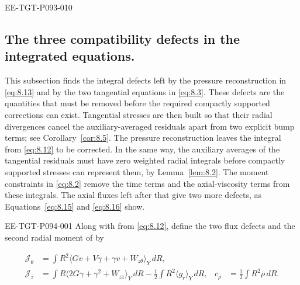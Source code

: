 \begin{EESegment}{EE-TGT-P093-010}
\subsection{The three compatibility defects in the integrated equations.}\label{sec:8.4}
This subsection finds the integral defects left by the pressure reconstruction in \eqref{eq:8.13}
and by the two tangential equations in \eqref{eq:8.3}. These defects are the quantities that must be
removed before the required compactly supported corrections can exist. Tangential stresses are then
built so that their radial divergences cancel the auxiliary-averaged residuals apart from two
explicit bump terms; see Corollary~\ref{cor:8.5}. The pressure reconstruction leaves the integral
 from \eqref{eq:8.12} to be corrected. In the same way, the
auxiliary averages of the tangential residuals must have zero weighted radial integrals before
compactly supported stresses can represent them, by Lemma~\ref{lem:8.2}. The moment constraints
in \eqref{eq:8.2} remove the time terms and the axial-viscosity terms from these integrals. The axial
fluxes left after that give two more defects, as Equations~\eqref{eq:8.15} and \eqref{eq:8.16} show.
\end{EESegment}

%
\begin{EESegment}{EE-TGT-P094-001}
Along with  from \eqref{eq:8.12}, define the two flux defects and
the second radial moment  of  by
\end{EESegment}
\begin{equation}
\begin{aligned}
\mathcal J_\theta
  &=\int R^2\langle Gv+V\gamma+\gamma v+W_{z\theta}\rangle_Y\,dR,\\
\mathcal J_z
  &=\int R\langle2G\gamma+\gamma^2+W_{zz}\rangle_Y\,dR
    -\frac12\int R^2\langle g_r\rangle_Y\,dR,
&c_\rho&=\frac12\int R^2\rho\,dR.
\end{aligned}
\tag{8.15}\label{eq:8.15}
\end{equation}


